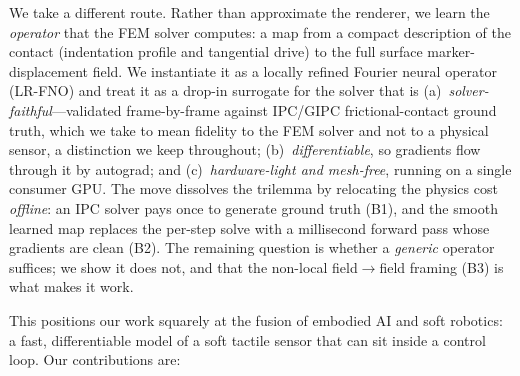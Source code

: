 \documentclass[conference]{IEEEtran}
\begin{document}
We take a different route. Rather than approximate the renderer, we learn the
\emph{operator} that the FEM solver computes: a map from a compact description of
the contact (indentation profile and tangential drive) to the full surface
marker-displacement field. We instantiate it as a locally refined Fourier
neural operator (LR-FNO) and treat it as a drop-in surrogate for the solver that is
(a)~\emph{solver-faithful}---validated frame-by-frame against IPC/GIPC
frictional-contact ground truth, which we take to mean fidelity to the FEM solver
and not to a physical sensor, a distinction we keep throughout;
(b)~\emph{differentiable}, so gradients flow
through it by autograd;
and (c)~\emph{hardware-light and mesh-free}, running on a single consumer GPU.
The move dissolves the trilemma by relocating the physics cost \emph{offline}: an
IPC solver pays once to generate ground truth (B1), and the smooth learned map
replaces the per-step solve with a millisecond forward pass whose gradients are
clean (B2). The remaining question is whether a \emph{generic} operator suffices;
we show it does not, and that the non-local field$\to$field framing (B3) is what
makes it work.

This positions our work squarely at the fusion of embodied AI and soft robotics:
a fast, differentiable model of a soft tactile sensor that can sit inside a
control loop. Our contributions are:
\end{document}
